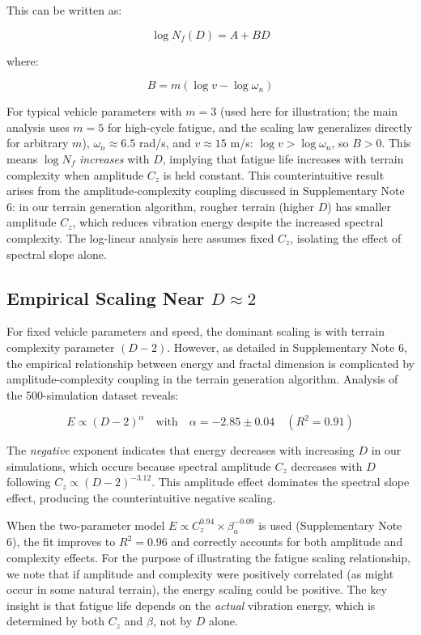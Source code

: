 \documentclass[11pt,letterpaper]{article}
\begin{document}
This can be written as:

\begin{equation}
\log N_f(D) = A + BD
\end{equation}

where:

\begin{equation}
B = m(\log v - \log \omega_n)
\end{equation}

For typical vehicle parameters with $m = 3$ (used here for illustration; the main analysis uses $m = 5$ for high-cycle fatigue, and the scaling law generalizes directly for arbitrary $m$), $\omega_n \approx 6.5$ rad/s, and $v \approx 15$ m/s: $\log v > \log \omega_n$, so $B > 0$. This means $\log N_f$ \textit{increases} with $D$, implying that fatigue life increases with terrain complexity when amplitude $C_z$ is held constant. This counterintuitive result arises from the amplitude-complexity coupling discussed in Supplementary Note 6: in our terrain generation algorithm, rougher terrain (higher $D$) has smaller amplitude $C_z$, which reduces vibration energy despite the increased spectral complexity. The log-linear analysis here assumes fixed $C_z$, isolating the effect of spectral slope alone.

\subsection{Empirical Scaling Near $D \approx 2$}

For fixed vehicle parameters and speed, the dominant scaling is with terrain complexity parameter $(D-2)$. However, as detailed in Supplementary Note 6, the empirical relationship between energy and fractal dimension is complicated by amplitude-complexity coupling in the terrain generation algorithm. Analysis of the 500-simulation dataset reveals:

\begin{equation}
E \propto (D-2)^\alpha \quad \text{with} \quad \alpha = -2.85 \pm 0.04 \quad (R^2 = 0.91)
\end{equation}

The \textit{negative} exponent indicates that energy decreases with increasing $D$ in our simulations, which occurs because spectral amplitude $C_z$ decreases with $D$ following $C_z \propto (D-2)^{-3.12}$. This amplitude effect dominates the spectral slope effect, producing the counterintuitive negative scaling.

When the two-parameter model $E \propto C_z^{0.94} \times \beta_a^{-0.09}$ is used (Supplementary Note 6), the fit improves to $R^2 = 0.96$ and correctly accounts for both amplitude and complexity effects. For the purpose of illustrating the fatigue scaling relationship, we note that if amplitude and complexity were positively correlated (as might occur in some natural terrain), the energy scaling could be positive. The key insight is that fatigue life depends on the \textit{actual} vibration energy, which is determined by both $C_z$ and $\beta$, not by $D$ alone.
\end{document}
